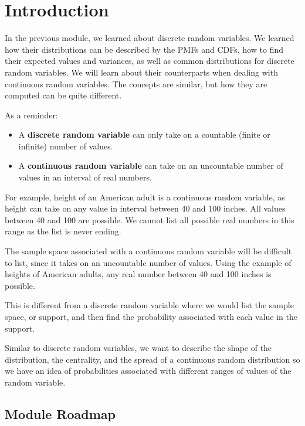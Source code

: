 \documentclass[
]{book}
\providecommand{\tightlist}{%
  \setlength{\itemsep}{0pt}\setlength{\parskip}{0pt}}
\begin{document}
\hypertarget{introduction}{%
\section{Introduction}\label{introduction}}

In the previous module, we learned about discrete random variables. We learned how their distributions can be described by the PMFs and CDFs, how to find their expected values and variances, as well as common distributions for discrete random variables. We will learn about their counterparts when dealing with continuous random variables. The concepts are similar, but how they are computed can be quite different.

As a reminder:

\begin{itemize}
\tightlist
\item
  A \textbf{discrete random variable} can only take on a countable (finite or infinite) number of values.
\item
  A \textbf{continuous random variable} can take on an uncountable number of values in an interval of real numbers.
\end{itemize}

For example, height of an American adult is a continuous random variable, as height can take on any value in interval between 40 and 100 inches. All values between 40 and 100 are possible. We cannot list all possible real numbers in this range as the list is never ending.

The sample space associated with a continuous random variable will be difficult to list, since it takes on an uncountable number of values. Using the example of heights of American adults, any real number between 40 and 100 inches is possible.

This is different from a discrete random variable where we would list the sample space, or support, and then find the probability associated with each value in the support.

Similar to discrete random variables, we want to describe the shape of the distribution, the centrality, and the spread of a continuous random distribution so we have an idea of probabilities associated with different ranges of values of the random variable.

\hypertarget{module-roadmap-2}{%
\subsection{Module Roadmap}\label{module-roadmap-2}}
\end{document}
